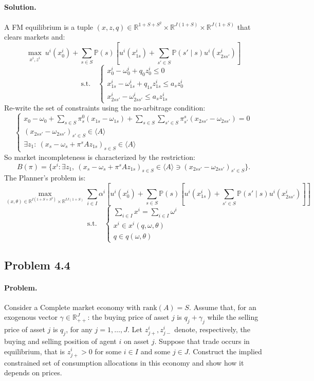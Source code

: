 \paragraph{Solution.}
A FM equilibrium is a tuple $(x, z, q) \in \mathbb{R}^{1 + S + S^2} \times \mathbb{R}^{J(1+S)} \times \mathbb{R}^{J(1+S)}$ that clears markets and:
\[
\max_{x^i, z^i} \ u^i(x_0^i) + \sum_{s \in S} \mathbb{P}(s) \left[ u^i(x_{1s}^i) + \sum_{s' \in S} \mathbb{P}(s' \mid s) u^i(x_{2ss'}^i) \right]
\]
\[
\text{s.t.} \quad
\begin{cases}
x_0^i - \omega_0^i + q_0 z_0^i \leq 0 \\
x_{1s}^i - \omega_{1s}^i + q_{1s} z_{1s}^i \leq a_s z_0^i \\
x_{2ss'}^i - \omega_{2ss'}^i \leq a_s z_{1s}^i
\end{cases}
\]
Re-write the set of constraints using the no-arbitrage condition:
\[
\begin{cases}
x_0 - \omega_0 + \sum_{s \in S} \pi_s^0 (x_{1s} - \omega_{1s}) + \sum_{s \in S} \sum_{s' \in S} \pi_{s'}^s (x_{2ss'} - \omega_{2ss'}) = 0 \\
(x_{2ss'} - \omega_{2ss'})_{s' \in S} \in \langle A \rangle \\
\exists z_1: \ (x_s - \omega_s + \pi^s A z_{1s})_{s \in S} \in \langle A \rangle
\end{cases}
\]
So market incompleteness is characterized by the restriction:
\[
B(\pi) = \{ x^i : \exists z_1, \ (x_s - \omega_s + \pi^s A z_{1s})_{s \in S} \in \langle A \rangle \ni (x_{2ss'} - \omega_{2ss'})_{s' \in S} \}.
\]
The Planner's problem is:
\[
\max_{(x, \theta) \in \mathbb{R}^{I(1+S+S^2)} \times \mathbb{R}^{IJ(1+S)}}
\sum_{i \in I} \alpha^i \left[ u^i(x_0^i) + \sum_{s \in S} \mathbb{P}(s) \left[ u^i(x_{1s}^i) + \sum_{s' \in S} \mathbb{P}(s' \mid s) u^i(x_{2ss'}^i) \right] \right]
\]
\[
\text{s.t.} \quad
\begin{cases}
\sum_{i \in I} x^i = \sum_{i \in I} \omega^i \\
x^i \in x^i(q, \omega, \theta) \\
q \in q(\omega, \theta)
\end{cases}
\]

\subsection{Problem 4.4}
\paragraph{Problem.} Consider a Complete market economy with $\text{rank}(A) = S$. Assume that, for an exogenous vector $\gamma \in \mathbb{R}_{++}^J$: the buying price of asset $j$ is $q_j + \gamma_j$ while the selling price of asset $j$ is $q_j$, for any $j = 1, \ldots, J$. Let $z_{j+}^i, z_{j-}^i$ denote, respectively, the buying and selling position of agent $i$ on asset $j$. Suppose that trade occurs in equilibrium, that is $z_{j+}^i > 0$ for some $i \in I$ and some $j \in J$. Construct the implied constrained set of consumption allocations in this economy and show how it depends on prices.

